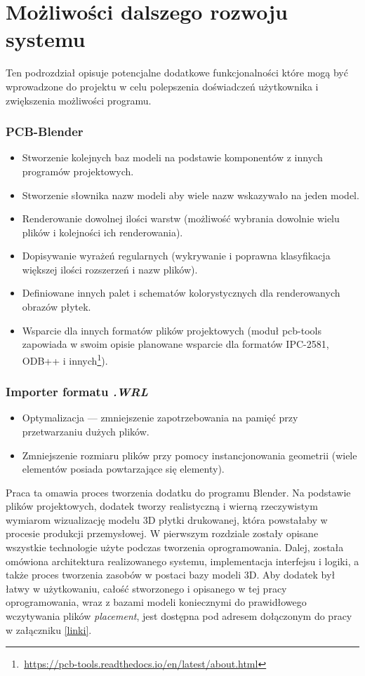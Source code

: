 \documentclass{xmgr}
\begin{document}
\section{Możliwości dalszego rozwoju systemu}
Ten podrozdział opisuje potencjalne dodatkowe funkcjonalności które mogą być wprowadzone do projektu w celu polepszenia doświadczeń użytkownika i zwiększenia możliwości programu.

\subsubsection{PCB-Blender}
\begin{itemize}
\item Stworzenie kolejnych baz modeli na podstawie komponentów z innych programów projektowych.
\item Stworzenie słownika nazw modeli aby wiele nazw wskazywało na jeden model.
\item Renderowanie dowolnej ilości warstw (możliwość wybrania dowolnie wielu plików i kolejności ich renderowania).
\item Dopisywanie wyrażeń regularnych (wykrywanie i poprawna klasyfikacja większej ilości rozszerzeń i nazw plików).
\item Definiowane innych palet i schematów kolorystycznych dla renderowanych obrazów płytek.
\item Wsparcie dla innych formatów plików projektowych (moduł pcb-tools zapowiada w swoim opisie planowane wsparcie dla formatów IPC-2581, ODB++ i innych\footnote{\,\url{https://pcb-tools.readthedocs.io/en/latest/about.html}}).
\end{itemize}

\subsubsection{Importer formatu \emph{.WRL}}
\begin{itemize}
\item Optymalizacja --- zmniejszenie zapotrzebowania na pamięć przy przetwarzaniu dużych plików.
\item Zmniejszenie rozmiaru plików przy pomocy instancjonowania geometrii (wiele elementów posiada powtarzające się elementy).
\end{itemize}

\summary

Praca ta omawia proces tworzenia dodatku do programu Blender. Na podstawie plików projektowych, dodatek tworzy realistyczną i wierną rzeczywistym wymiarom wizualizację modelu 3D płytki drukowanej, która powstałaby w procesie produkcji przemysłowej. W pierwszym rozdziale zostały opisane wszystkie technologie użyte podczas tworzenia oprogramowania. Dalej, została omówiona architektura realizowanego systemu, implementacja interfejsu i logiki, a także proces tworzenia zasobów w postaci bazy modeli 3D.
Aby dodatek był łatwy w użytkowaniu, całość stworzonego i opisanego w tej pracy oprogramowania, wraz z bazami modeli koniecznymi do prawidłowego wczytywania plików \emph{placement}, jest dostępna pod adresem dołączonym do pracy w załączniku \ref{linki}. 
\end{document}
